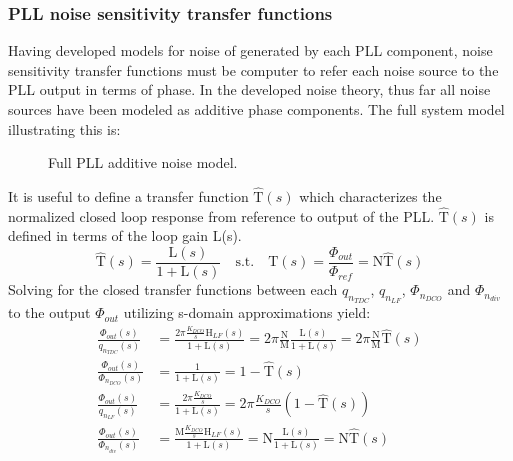 \subsubsection{PLL noise sensitivity transfer functions}
	Having developed models for noise of generated by each PLL component, noise sensitivity transfer functions must be computer to refer each noise source to the PLL output in terms of phase. In the developed noise theory, thus far all noise sources have been modeled as additive phase components. The full system model illustrating this is:
	\begin{figure}[htb!]
		\center
		\caption{Full PLL additive noise model.}
		\label{fig:full_pll_noise}
	\end{figure}
	\FloatBarrier
	It is useful to define a transfer function $\hat{\mathrm{T}}(s)$ which characterizes the normalized closed loop response from reference to output of the PLL. $\hat{\mathrm{T}}(s)$ is defined in terms of the loop gain L(s).
	\begin{equation}
	\hat{\mathrm{T}}(s) = \frac{\mathrm{L}(s)}{1+\mathrm{L}(s)}\hspace{1em} \text{s.t.} \hspace{1em} \mathrm{T}(s) = \frac{\Phi_{out}}{\Phi_{ref}} = \mathrm{N}\hat{\mathrm{T}}(s) 
	\end{equation}
	Solving for the closed transfer functions between each $q_{n_{TDC}}$, $q_{n_{LF}}$, $\Phi_{n_{DCO}}$ and $\Phi_{n_{div}}$ to the output $\Phi_{out}$ utilizing s-domain approximations yield:
	\begin{align}
		\frac{\Phi_{out}(s)}{q_{n_{TDC}}(s)} & = \frac{2\pi\frac{K_{DCO}}{s}\mathrm{H}_{LF}(s)}{1+\mathrm{L}(s)}= 2\pi\frac{\mathrm{N}}{\mathrm{M}}\frac{\mathrm{L}(s)}{1+\mathrm{L}(s)} = 2\pi\frac{\mathrm{N}}{\mathrm{M}}\hat{\mathrm{T}}(s)\\
		\frac{\Phi_{out}(s)}{\Phi_{n_{DCO}}(s)} & = \frac{1}{1+\mathrm{L}(s)}= 1-\hat{\mathrm{T}}(s)\\
		\frac{\Phi_{out}(s)}{q_{n_{LF}}(s)} & = \frac{2\pi\frac{K_{DCO}}{s}}{1+\mathrm{L}(s)} = 2\pi\frac{K_{DCO}}{s}(1-\hat{\mathrm{T}}(s))\\
		\frac{\Phi_{out}(s)}{\Phi_{n_{div}}(s)} & = \frac{\mathrm{M}\frac{K_{DCO}}{s}\mathrm{H}_{LF}(s)}{1+\mathrm{L}(s)}= \mathrm{N}\frac{\mathrm{L}(s)}{1+\mathrm{L}(s)} = \mathrm{N}\hat{\mathrm{T}}(s)
	\end{align}


